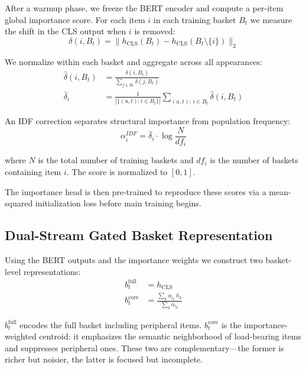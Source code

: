\documentclass[conference]{IEEEtran}
\begin{document}
After a warmup phase, we freeze the BERT encoder and compute a
per-item global importance score. For each item $i$ in each training
basket $B_t$ we measure the shift in the CLS output when $i$ is
removed:
\begin{equation}
\delta(i, B_t) = \|h_{\text{CLS}}(B_t) - h_{\text{CLS}}(B_t \setminus \{i\})\|_2
\end{equation}

We normalize within each basket and aggregate across all appearances:
\begin{align}
\hat{\delta}(i, B_t) &= \frac{\delta(i, B_t)}{\sum_{j \in B_t} \delta(j, B_t)} \\
\bar{\delta}_i        &= \frac{1}{|\{(u,t):i \in B_t\}|} \sum_{(u,t):\,i \in B_t} \hat{\delta}(i, B_t)
\end{align}

An IDF correction separates structural importance from population
frequency:
\begin{equation}
\alpha_i^{IDF} = \bar{\delta}_i \cdot \log\frac{N}{df_i}
\end{equation}

where $N$ is the total number of training baskets and $df_i$ is the
number of baskets containing item $i$. The score is normalized to $[0,1]$.

The importance head is then pre-trained to reproduce these scores
via a mean-squared initialization loss before main training begins.

\subsection{Dual-Stream Gated Basket Representation}

Using the BERT outputs and the importance weights we construct two
basket-level representations:
\begin{align}
b_t^{\text{full}} &= h_{\text{CLS}} \\
b_t^{\text{core}} &= \frac{\sum_k \alpha_{i_k}\, h_k}{\sum_k \alpha_{i_k}}
\end{align}

$b_t^{\text{full}}$ encodes the full basket including peripheral items.
$b_t^{\text{core}}$ is the importance-weighted centroid: it emphasizes
the semantic neighborhood of load-bearing items and suppresses peripheral
ones. These two are complementary---the former is richer but noisier,
the latter is focused but incomplete.
\end{document}
